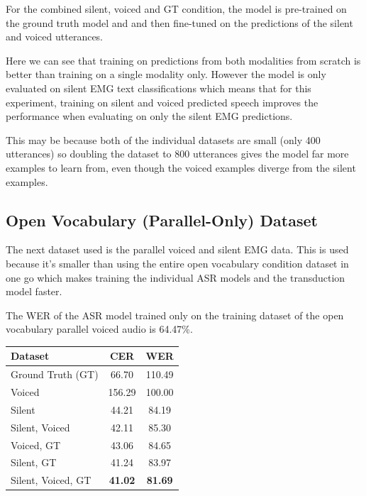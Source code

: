 For the combined silent, voiced and GT condition, the model is pre-trained on the
ground truth model and and then fine-tuned on the predictions of the
silent and voiced utterances.

Here we can see that training on predictions from both modalities from scratch
is better than training on a single modality only. However the model is only
evaluated on silent EMG text classifications which means that for this experiment,
training on silent and voiced predicted speech improves the performance when
evaluating on only the silent EMG predictions.

This may be because both of the
individual datasets are small (only 400 utterances) so doubling the dataset to
800 utterances gives the model far more examples to learn from, even though the
voiced examples diverge from the silent examples.

\subsection{Open Vocabulary (Parallel-Only) Dataset}

The next dataset used is the parallel voiced and silent EMG data. This is used because
it's smaller than using the entire open vocabulary condition dataset in one go which
makes training the individual ASR models and the transduction model faster.

The WER of the ASR model trained only on the
training dataset of the open vocabulary parallel voiced audio is 64.47\%.

{\small\begin{center}
\begin{tabular} {  l  c  c  }
\hline
\textbf{Dataset} & \textbf{CER} & \textbf{WER} \\
\hline
Ground Truth (GT) & 66.70 & 110.49 \\
Voiced & 156.29 & 100.00 \\
Silent & 44.21 & 84.19 \\
Silent, Voiced & 42.11 & 85.30 \\
Voiced, GT & 43.06 & 84.65 \\
Silent, GT & 41.24 & 83.97 \\
\hline
Silent, Voiced, GT & \textbf{41.02} & \textbf{81.69} \\
\hline
\end{tabular}
\end{center}}

